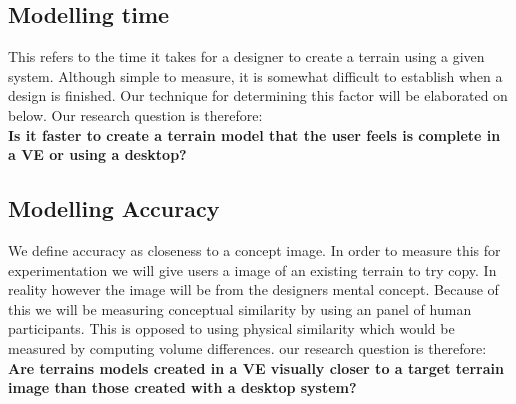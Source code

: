 \documentclass{sig-alternate-05-2015}
\begin{document}
\subsection{Modelling time}
This refers to the time it takes for a designer to create a terrain using a given system. Although simple to measure, it is somewhat difficult to establish when a design is finished. Our technique for determining this factor will be elaborated on below. Our research question is therefore:\\
\textbf{Is it faster to create a terrain model that the user feels is complete in a VE or using a desktop?}\\
\subsection{Modelling Accuracy}
We define accuracy as closeness to a concept image. In order to measure this for experimentation we will give users a image of an existing terrain to try copy. In reality however the image will be from the designers mental concept. Because of this we will be measuring conceptual similarity by using an panel of human participants. This is opposed to using physical similarity which would be measured by computing volume differences. our research question is therefore:\\
\textbf{Are terrains models created in a VE visually closer to a target terrain image than those created with a desktop system?}\\
\end{document}
